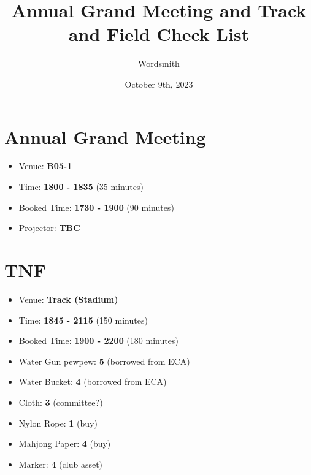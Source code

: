 \documentclass{article}
\begin{document}
\title{Annual Grand Meeting and Track and Field Check List}
\author{Wordsmith}
\date{October 9th, 2023}
\maketitle

\section{Annual Grand Meeting}

  \begin{itemize}
    \item Venue: \textbf{B05-1}
    \item Time: \textbf{1800 - 1835} (35 minutes)
    \item Booked Time: \textbf{1730 - 1900} (90 minutes)
    \item Projector: \textbf{TBC}
  \end{itemize}

\section{TNF}

  \begin{itemize}
    \item Venue: \textbf{Track (Stadium)}
    \item Time: \textbf{1845 - 2115} (150 minutes)
    \item Booked Time: \textbf{1900 - 2200} (180 minutes)
    \item Water Gun pewpew: \textbf{5} (borrowed from ECA)
    \item Water Bucket: \textbf{4} (borrowed from ECA)
    \item Cloth: \textbf{3} (committee?)
    \item Nylon Rope: \textbf{1} (buy)
    \item Mahjong Paper: \textbf{4} (buy)
    \item Marker: \textbf{4} (club asset)
  \end{itemize}
\end{document}
